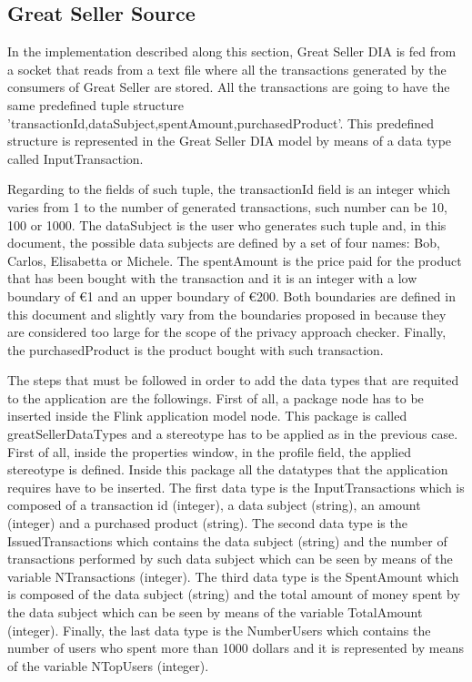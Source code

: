\subsection{Great Seller Source}

In the implementation described along this section, Great Seller DIA is fed from a socket that reads from a text file where all the transactions generated by the consumers of Great Seller are stored. All the transactions are going to have the same predefined tuple structure 'transactionId,dataSubject,spentAmount,purchasedProduct'. This predefined structure is represented in the Great Seller DIA model by means of a data type called InputTransaction.

Regarding to the fields of such tuple, the transactionId field is an integer which varies from 1 to the number of generated transactions, such number can be 10, 100 or 1000. The dataSubject is the user who generates such tuple and, in this document, the possible data subjects are defined by a set of four names: Bob, Carlos, Elisabetta or Michele. The spentAmount is the price paid for the product that has been bought with the transaction and it is an integer with a low boundary of \euro{1} and an upper boundary of \euro{200}. Both boundaries are defined in this document and slightly vary from the boundaries proposed in \cite{privacypoliciesarticle} because they are considered too large for the scope of the privacy approach checker. Finally, the purchasedProduct is the product bought with such transaction.

The steps that must be followed in order to add the data types that are requited to the application are the followings. First of all, a package node has to be inserted inside the Flink application model node. This package is called greatSellerDataTypes and a stereotype has to be applied as in the previous case. First of all, inside the properties window, in the profile field, the applied stereotype is defined. Inside this package all the datatypes that the application requires have to be inserted. The first data type is the InputTransactions which is composed of a transaction id (integer), a data subject (string), an amount (integer) and a purchased product (string). The second data type is the IssuedTransactions which contains the data subject (string) and the number of transactions performed by such data subject which can be seen by means of the variable NTransactions (integer). The third data type is the SpentAmount which is composed of the data subject (string) and the total amount of money spent by the data subject which can be seen by means of the variable TotalAmount (integer). Finally, the last data type is the NumberUsers which contains the number of users who spent more than 1000 dollars and it is represented by means of the variable NTopUsers (integer).

